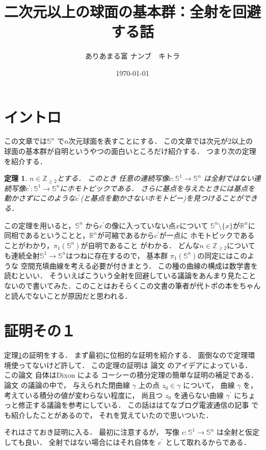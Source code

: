 \documentclass[leqno, a4paper, 12pt]{jsarticle}
\title{二次元以上の球面の基本群：全射を回避する話}
\author{ありあまる富 ナンブ　キトラ}
\date{\today}
\newtheorem{thm}{定理}
\newcommand{\zz}{\mathbb{Z}}
\newcommand{\rr}{\mathbb{R}}
\newcommand{\mysp}[1]{\mathbb{S}^{#1}}
\begin{document}
\maketitle

\section{イントロ}
この文章では$\mysp{n}$
で$n$次元球面を表すことにする．
この文章では次元が$2$以上の
球面の基本群が自明というやつの面白いところだけ紹介する．
つまり次の定理を紹介する．

\begin{thm}\label{thm:1}
$n\in \zz_{\ge 2}$とする．
このとき
任意の連続写像$c\colon \mysp{1}\to \mysp{n}$
は全射ではない連続写像$c^{\prime}\colon \mysp{1}\to \mysp{n}$にホモトピックである．
さらに基点を与えたときには基点を動かさずにこのような$c^{\prime}$(と基点を動かさないホモトピー)を見つけることができる．
\end{thm}
この定理を用いると，$\mysp{n}$
から$c^{\prime}$の像に入っていない点$x$について
$\mysp{n}\setminus\{x\}$が$\rr^{n}$に同相であるということと，$\rr^{n}$が可縮であるから$c^{\prime}$が一点に
ホモトピックであることがわかり，$\pi_{1}(\mysp{n})$が自明であること
がわかる．
どんな$n\in \zz_{\ge 2}$についても連続全射$\mysp{1}\to \mysp{n}$はつねに存在するので，
基本群
$\pi_{1}(\mysp{n})$の同定にはこのような
空間充填曲線を考える必要が付きまとう．
この種の曲線の構成は数学書\cite{spf}を読むといい．
そういえばこういう全射を回避している議論をあんまり見たことないので書いてみた．このことはおそらくこの文書の筆者が代トポの本をちゃんと読んでないことが原因だと思われる．



\section{証明その１}
定理\ref{thm:1}の証明をする．
まず最初に位相的な証明を紹介する．
面倒なので定理環境使ってないけど許して．
この定理の証明は
論文
\cite{Lo}
のアイデアによっている．
この論文
\cite{Lo}
自体はDixon\cite{Di}
による
コーシーの積分定理の簡単な証明の補足である．
論文
\cite{Lo}
の議論の中で，
与えられた閉曲線
$\gamma$
上の点
$z_{0}\in \gamma$
について，
曲線
$\gamma$
を，考えている積分の値が変わらない程度に，
尚且つ
$z_{0}$
を通らない曲線
$\gamma^{\prime}$
にちょっと修正する議論を参考にしている．
この話ははてなブログ電波通信の記事
\cite{Den1}
でも紹介したことがあるので，
それを覚えていたので思いついた．

それはさておき証明に入る．
最初に注意するが，
写像
$c\colon \mysp{1}\to \mysp{n}$
は全射と仮定しても良い．
全射ではない場合にはそれ自体を
$c^{\prime}$
として取れるからである．
\end{document}
